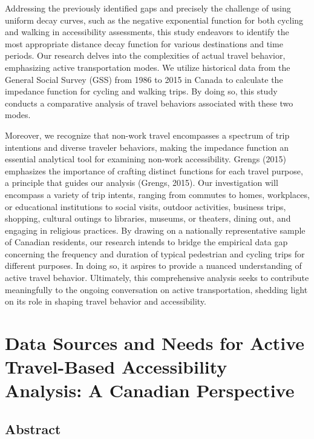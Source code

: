 \documentclass[
11pt, %
oneside, %
english, %
singlespacing, %
]{macthesis} %
\begin{document}
Addressing the previously identified gaps and precisely the challenge of using uniform decay curves, such as the negative exponential function for both cycling and walking in accessibility assessments, this study endeavors to identify the most appropriate distance decay function for various destinations and time periods. Our research delves into the complexities of actual travel behavior, emphasizing active transportation modes. We utilize historical data from the General Social Survey (GSS) from 1986 to 2015 in Canada to calculate the impedance function for cycling and walking trips. By doing so, this study conducts a comparative analysis of travel behaviors associated with these two modes.

Moreover, we recognize that non-work travel encompasses a spectrum of trip intentions and diverse traveler behaviors, making the impedance function an essential analytical tool for examining non-work accessibility. Grengs (2015) emphasizes the importance of crafting distinct functions for each travel purpose, a principle that guides our analysis (Grengs, 2015). Our investigation will encompass a variety of trip intents, ranging from commutes to homes, workplaces, or educational institutions to social visits, outdoor activities, business trips, shopping, cultural outings to libraries, museums, or theaters, dining out, and engaging in religious practices. By drawing on a nationally representative sample of Canadian residents, our research intends to bridge the empirical data gap concerning the frequency and duration of typical pedestrian and cycling trips for different purposes. In doing so, it aspires to provide a nuanced understanding of active travel behavior. Ultimately, this comprehensive analysis seeks to contribute meaningfully to the ongoing conversation on active transportation, shedding light on its role in shaping travel behavior and accessibility.

\chapter{Data Sources and Needs for Active Travel-Based Accessibility Analysis: A Canadian Perspective}\label{rmd-basics}

\section{Abstract}\label{abstract}
\end{document}
